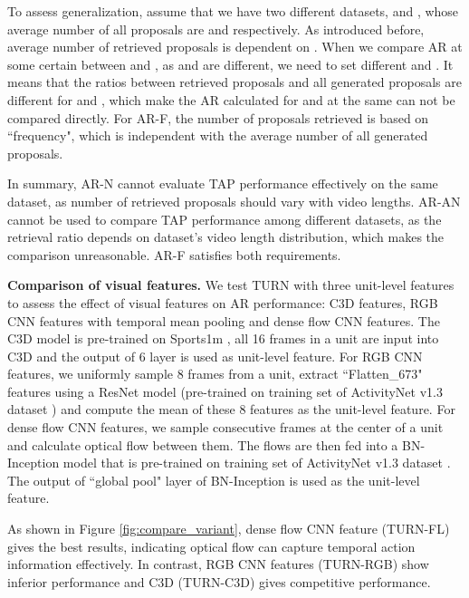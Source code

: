 \documentclass[10pt,twocolumn,letterpaper]{article}
\begin{document}
To assess generalization, assume that we have two different datasets,  and , whose average number of all proposals are  and  respectively. As introduced before, average number of retrieved proposals  is dependent on . When we compare AR at some certain  between  and , as  and  are different, we need to set different  and . It means that the ratios between retrieved proposals and all generated proposals are different for  and , which make the AR calculated for  and  at the same  can not be compared directly. For AR-F, the number of proposals retrieved is based on ``frequency", which is independent with the average number of all generated proposals.

In summary, AR-N cannot evaluate TAP performance effectively on the same dataset, as number of retrieved proposals should vary with video lengths. AR-AN cannot be used to compare TAP performance among different datasets, as the retrieval ratio depends on dataset's video length distribution, which makes the comparison unreasonable. AR-F satisfies both requirements. 




\textbf{Comparison of visual features.} We test TURN with three unit-level features to assess the effect of visual features on AR performance: C3D \cite{tran2015learning} features, RGB CNN features with temporal mean pooling and dense flow CNN \cite{xiong2016cuhk} features. The C3D model is pre-trained on Sports1m \cite{Karpathy_2014_CVPR}, all 16 frames in a unit are input into C3D and the output of 6 layer is used as unit-level feature. For RGB CNN features, we  uniformly sample 8 frames from a unit, extract ``Flatten\_673" features using a ResNet \cite{He_2016_CVPR} model (pre-trained on training set of ActivityNet v1.3 dataset \cite{xiong2016cuhk}) and compute the mean of these 8 features as the unit-level feature. For dense flow CNN features, we sample  consecutive frames at the center of a unit and calculate optical flow \cite{farneback2003two} between them. The flows are then fed into a BN-Inception model \cite{xiong2016cuhk,ioffe2015batch} that is pre-trained on training set of ActivityNet v1.3 dataset \cite{xiong2016cuhk}. The output of ``global pool" layer of BN-Inception is used as the unit-level feature.

As shown in Figure \ref{fig:compare_variant}, dense flow CNN feature (TURN-FL) gives the best results, indicating optical flow can capture temporal action information effectively. In contrast, RGB CNN features (TURN-RGB) show inferior performance and C3D (TURN-C3D) gives competitive performance.
\end{document}
